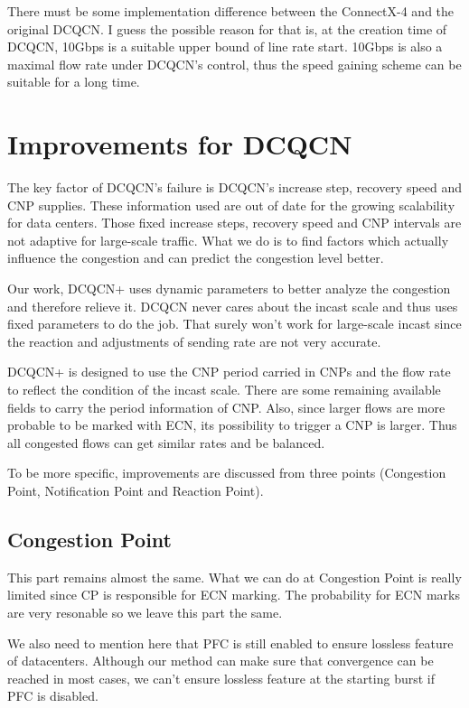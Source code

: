 \documentclass[12pt,a4paper]{article}
\begin{document}
There must be some implementation difference between the ConnectX-4 and the original DCQCN.
I guess the possible reason for that is, at the creation time of DCQCN, 10Gbps is a suitable upper bound of line rate start.
10Gbps is also a maximal flow rate under DCQCN's control, thus the speed gaining scheme can be suitable for a long time.

\section{Improvements for DCQCN}

The key factor of DCQCN's failure is DCQCN's increase step, recovery speed and CNP supplies.
These information used are out of date for the growing scalability for data centers.
Those fixed increase steps, recovery speed and CNP intervals are not adaptive for large-scale traffic.
What we do is to find factors which actually influence the congestion and can predict the congestion level better.

Our work, DCQCN+ uses dynamic parameters to better analyze the congestion and therefore relieve it.
DCQCN never cares about the incast scale and thus uses fixed parameters to do the job.
That surely won't work for large-scale incast since the reaction and adjustments of sending rate are not very accurate.

DCQCN+ is designed to use the CNP period carried in CNPs and the flow rate to reflect the condition of the incast scale.
There are some remaining available fields to carry the period information of CNP.
Also, since larger flows are more probable to be marked with ECN, its possibility to trigger a CNP is larger.
Thus all congested flows can get similar rates and be balanced.

To be more specific, improvements are discussed from three points (Congestion Point, Notification Point and Reaction Point).

\subsection{Congestion Point}

This part remains almost the same.
What we can do at Congestion Point is really limited since CP is responsible for ECN marking.
The probability for ECN marks are very resonable so we leave this part the same.

We also need to mention here that PFC is still enabled to ensure lossless feature of datacenters.
Although our method can make sure that convergence can be reached in most cases, we can't ensure lossless feature at the starting burst
if PFC is disabled.
\end{document}
